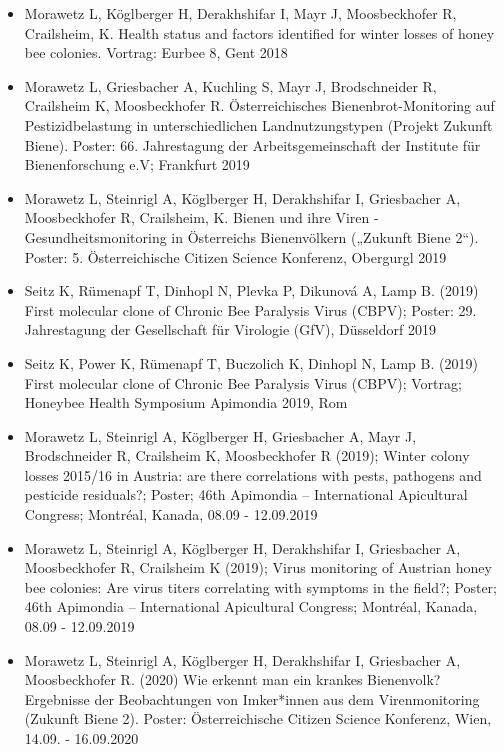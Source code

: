 \begin{itemize}

    \item 
    Morawetz L, Köglberger H, Derakhshifar I, Mayr J, Moosbeckhofer R, Crailsheim, K. Health status and factors identified for winter losses of honey bee colonies. Vortrag: Eurbee 8, Gent 2018
    
    \item 
    Morawetz L, Griesbacher A, Kuchling S, Mayr J, Brodschneider R, Crailsheim K, Moosbeckhofer R. Österreichisches Bienenbrot-Monitoring auf Pestizidbelastung in unterschiedlichen Landnutzungstypen (Projekt Zukunft Biene). Poster: 66. Jahrestagung der Arbeitsgemeinschaft der Institute für Bienenforschung e.V; Frankfurt 2019

    \item 
    Morawetz L, Steinrigl A, Köglberger H, Derakhshifar I, Griesbacher A, Moosbeckhofer R, Crailsheim, K. Bienen und ihre Viren - Gesundheitsmonitoring in Österreichs Bienenvölkern („Zukunft Biene 2“). Poster: 5. Österreichische Citizen Science Konferenz, Obergurgl 2019

    \item 
    Seitz K, Rümenapf T, Dinhopl N, Plevka P, Dikunová A, Lamp B. (2019) First molecular clone of Chronic Bee Paralysis Virus (CBPV); Poster: 29. Jahrestagung der Gesellschaft für Virologie (GfV), Düsseldorf 2019

    \item 
    Seitz K, Power K, Rümenapf T, Buczolich K, Dinhopl N, Lamp B. (2019) First molecular clone of Chronic Bee Paralysis Virus (CBPV); Vortrag; Honeybee Health Symposium Apimondia 2019, Rom
    
    \item
    Morawetz L, Steinrigl A, Köglberger H, Griesbacher A, Mayr J, Brodschneider R, Crailsheim K, Moosbeckhofer R (2019); Winter colony losses 2015/16 in Austria: are there correlations with pests, pathogens and pesticide residuals?; Poster; 46th Apimondia – International Apicultural Congress; Montréal, Kanada, 08.09 - 12.09.2019
    
    \item
    Morawetz L, Steinrigl A, Köglberger H, Derakhshifar I, Griesbacher A, Moosbeckhofer R, Crailsheim K (2019); Virus monitoring of Austrian honey bee colonies: Are virus titers correlating with symptoms in the field?; Poster; 46th Apimondia – International Apicultural Congress; Montréal, Kanada, 08.09 - 12.09.2019 
    
    \item
    Morawetz L, Steinrigl A, Köglberger H, Derakhshifar I, Griesbacher A, Moosbeckhofer R. (2020) Wie erkennt man ein krankes Bienenvolk? Ergebnisse der Beobachtungen von Imker*innen aus dem Virenmonitoring (Zukunft Biene 2). Poster: Österreichische Citizen Science Konferenz, Wien, 14.09. - 16.09.2020

\end{itemize}


